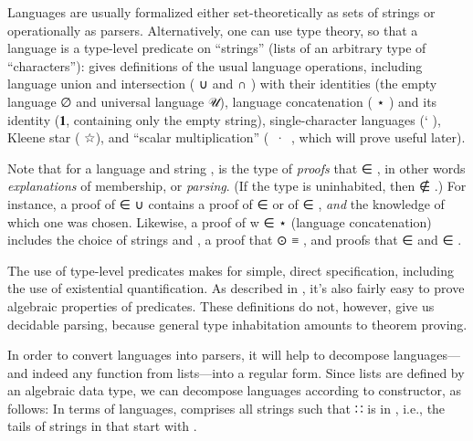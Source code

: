 \documentclass[acmsmall,screen,anonymous,timestamp]{acmart}
\begin{document}
Languages are usually formalized either set-theoretically as sets of strings or operationally as parsers.
Alternatively, one can use type theory, so that a language is a type-level predicate on ``strings'' (lists of an arbitrary type  of ``characters''):
 gives definitions of the usual language operations, including language union and intersection ({ \AF ∪ } and { \AF ∩ }) with their identities (the empty language \AF ∅ and universal language \AF 𝒰), language concatenation ({ \AF ⋆ }) and its identity (\AF 𝟏, containing only the empty string), single-character languages ({\AF ` }), Kleene star ({ \AF ☆}), and ``scalar multiplication'' (\mbox{ \AF · }, which will prove useful later).

Note that for a language  and string , { } is the type of \emph{proofs} that { ∈ }, in other words \emph{explanations} of membership, or \emph{parsing}.
(If the type { } is uninhabited, then { ∉ }.)
For instance, a proof of { ∈  \AF ∪ } contains a proof of { ∈ } or of { \AF ∈ }, \emph{and} the knowledge of which one was chosen.
Likewise, a proof of {w ∈  \AF ⋆ } (language concatenation) includes the choice of strings  and , a proof that { \AF ⊙  \AD ≡ }, and proofs that { ∈ } and { ∈ }.

The use of type-level predicates makes for simple, direct specification, including the use of existential quantification.
As described in , it's also fairly easy to prove algebraic properties of predicates.
These definitions do not, however, give us decidable parsing, because general type inhabitation amounts to theorem proving.


\rnc{}

In order to convert languages into parsers, it will help to decompose languages---and indeed any function from lists---into a regular form.
Since lists are defined by an algebraic data type, we can decompose languages according to constructor, as follows:
In terms of languages, {  } comprises all strings  such that { \AIC ∷ } is in , i.e., the tails of strings in  that start with .
\end{document}
